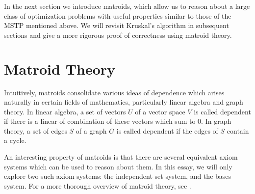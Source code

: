 \documentclass[a4paper,11pt]{report}
\theoremstyle{plain}
\theoremstyle{definition}
\begin{document}

%





In the next section we introduce matroids, which allow us to reason about a
large class of optimization problems with useful properties similar to those of
the MSTP mentioned above. We will revisit Kruskal's algorithm in subsequent
sections and give a more rigorous proof of correctness using matroid theory.

\section{Matroid Theory}

Intuitively, matroids consolidate various ideas of dependence which
arises naturally in certain fields of mathematics, particularly linear
algebra and graph theory. In linear algebra, a set of vectors $U$ of a
vector space $V$ is called dependent if there is a linear of combination of
these vectors which sum to $0$. In graph theory, a set of edges $S$ of a
graph $G$ is called dependent if the edges of $S$ contain a cycle.

An interesting property of matroids is that there are several equivalent
axiom systems which can be used to reason about them. In this essay, we
will only explore two such axiom systems: the independent set system, and
the bases system. For a more thorough overview of matroid theory, see
\cite{matroid-theory}.
\end{document}
